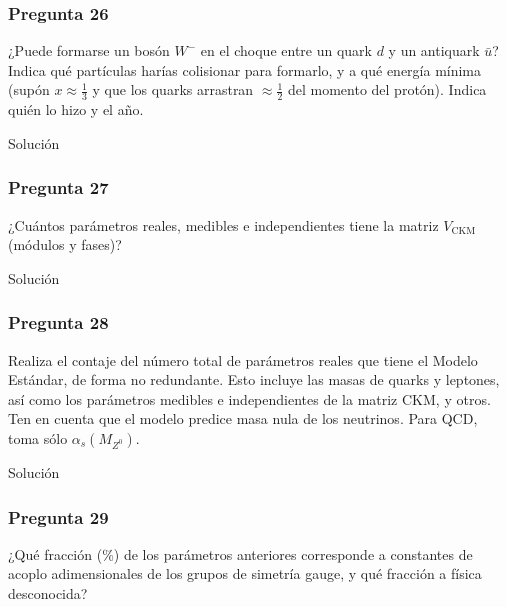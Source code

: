 \begin{Enunciado}
	\subsubsection*{Pregunta 26}

	¿Puede formarse un bosón $W^-$ en el choque entre un quark $d$ y un antiquark $\bar{u}$? Indica qué partículas harías colisionar para formarlo, y a qué energía mínima (supón $x \approx \frac{1}{3}$ y que los quarks arrastran $\approx \frac{1}{2}$ del momento del protón). Indica quién lo hizo y el año.

\end{Enunciado}

Solución

\vspace*{2em}

\begin{Enunciado}
	\subsubsection*{Pregunta 27}

	¿Cuántos parámetros reales, medibles e independientes tiene la matriz $V_{\text{CKM}}$ (módulos y fases)?

\end{Enunciado}

Solución

\vspace*{2em}

\begin{Enunciado}
	\subsubsection*{Pregunta 28}

	Realiza el contaje del número total de parámetros reales que tiene el Modelo Estándar, de forma no redundante. Esto incluye las masas de quarks y leptones, así como los parámetros medibles e independientes de la matriz CKM, y otros. Ten en cuenta que el modelo predice masa nula de los neutrinos. Para QCD, toma sólo $\alpha_s(M_{Z^0})$.

\end{Enunciado}

Solución

\vspace*{2em}

\begin{Enunciado}
	\subsubsection*{Pregunta 29}

	¿Qué fracción (\%) de los parámetros anteriores corresponde a constantes de acoplo adimensionales de los grupos de simetría gauge, y qué fracción a física desconocida?

\end{Enunciado}

